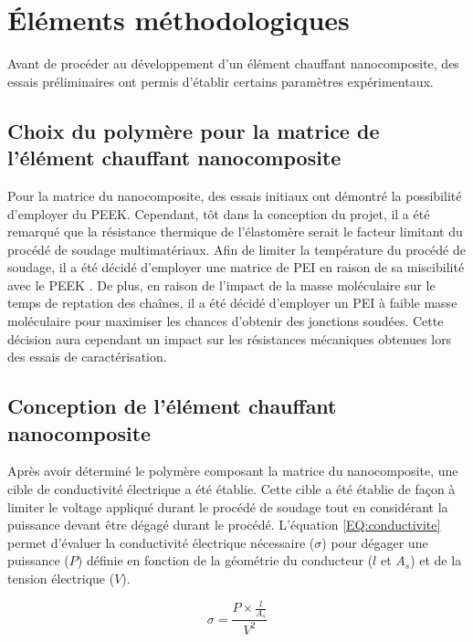 \section{Éléments méthodologiques}

Avant de procéder au développement d'un élément chauffant nanocomposite, des essais préliminaires ont permis d'établir certains paramètres expérimentaux. 

\subsection{Choix du polymère pour la matrice de l'élément chauffant nanocomposite}

Pour la matrice du nanocomposite, des essais initiaux ont démontré la possibilité d'employer du PEEK. 
Cependant, tôt dans la conception du projet, il a été remarqué que la résistance thermique de l'élastomère serait le facteur limitant du procédé de soudage multimatériaux. 
Afin de limiter la température du procédé de soudage, il a été décidé d'employer une matrice de PEI en raison de sa miscibilité avec le PEEK \cite{Torre1992,Crevecoeur1991}. 
De plus, en raison de l'impact de la masse moléculaire sur le temps de reptation des chaînes, il a été décidé d'employer un PEI à faible masse moléculaire pour maximiser les chances d'obtenir des jonctions soudées. 
Cette décision aura cependant un impact sur les résistances mécaniques obtenues lors des essais de caractérisation. 

\subsection{Conception de l'élément chauffant nanocomposite}

Après avoir déterminé le polymère composant la matrice du nanocomposite, une cible de conductivité électrique a été établie. 
Cette cible a été établie de façon à limiter le voltage appliqué durant le procédé de soudage tout en considérant la puissance devant être dégagé durant le procédé. 
L'équation \ref{EQ:conductivite} permet d'évaluer la conductivité électrique nécessaire ($\sigma$) pour dégager une puissance ($P$) définie en fonction de la géométrie du conducteur ($l$ et $A_s$) et de la tension électrique ($V$). 

\begin{equation}
\label{EQ:conductivite}
\sigma = \frac{P \times \frac{l}{A_s}}{V^2}
\end{equation} 

